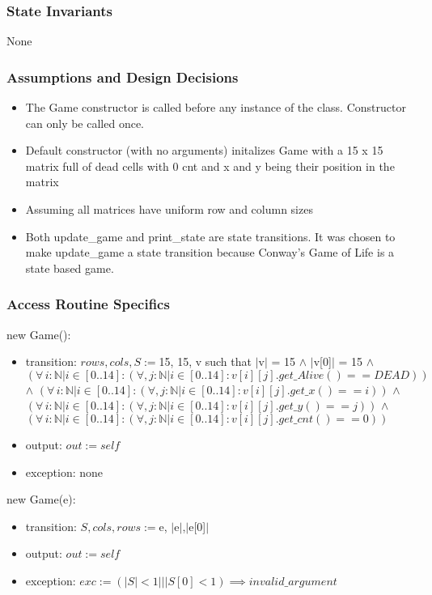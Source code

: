 \documentclass[]{article}
\begin{document}
\subsubsection*{State Invariants}
None

\subsubsection*{Assumptions and Design Decisions}
\begin{itemize}
\item The Game constructor is called before any instance of the class. Constructor can only be called once.
\item Default constructor (with no arguments) initalizes Game with a 15 x 15 matrix full of dead cells with 0 cnt and x and y being their position in the matrix
\item Assuming all matrices have uniform row and column sizes
\item Both update\_game and print\_state are state transitions. It was chosen to make update\_game a state transition because Conway's Game of Life is a state based game.
\end{itemize}

\subsubsection*{Access Routine Specifics}
new Game():
\begin{itemize}
\item transition: $rows, cols, S := $15, 15, v such that $\vert$v$\vert$ = 15 $\land$ $\vert$v[0]$\vert$ = 15 $\land$ 
$(\forall\, i: \mathbb{N} | i \in [0..14] :
  (\forall, j: \mathbb{N} | i \in [0..14]: v[i][j].get\_Alive() == DEAD) )$ $\land$ $(\forall\, i: \mathbb{N} | i \in [0..14] :
  (\forall, j: \mathbb{N} | i \in [0..14]: v[i][j].get\_x() == i) )$ $\land$ $(\forall\, i: \mathbb{N} | i \in [0..14] :
  (\forall, j: \mathbb{N} | i \in [0..14]: v[i][j].get\_y() == j) )$ $\land$ $(\forall\, i: \mathbb{N} | i \in [0..14] :
  (\forall, j: \mathbb{N} | i \in [0..14]: v[i][j].get\_cnt() == 0) )$


\item output: $\mathit{out} := \mathit{self}$
\item exception: none
\end{itemize}

new Game(e):
\begin{itemize}
\item transition: $S, cols,rows := $e, $\vert$e$\vert$,$\vert$e[0]$\vert$

\item output: $\mathit{out} := \mathit{self}$
\item exception: $exc := (|S| < 1 || |S[0] < 1 ) \implies invalid\_argument$
\end{itemize}
\end{document}
